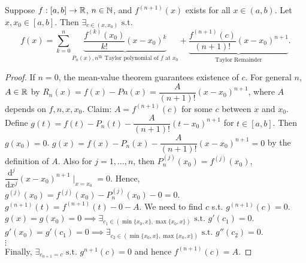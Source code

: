 \begin{thm}
	Suppose $f:[a,b]\to \mathbb{R}$, $n \in \mathbb{N}$, and $f^{(n+1)}(x)$ exists for all $x \in (a,b)$.
	Let $x, x_0 \in [a,b]$. Then $\exists_{c \in (x, x_0)} \text{ s.t. }$
	\[f(x)=\sum_{k=0}^{n}{\underbrace{\dfrac{f^{(k)}(x_0)}{k!} (x-x_0)^{k}}_{P_n(x),\text{$n^{\text{th}}$ Taylor polynomial of $f$ at $x_0$}}+\underbrace{\dfrac{f^{(n+1)}(c)}{(n+1)!}(x-x_0)^{n+1}}_{\text{Taylor Remainder}}}.\]
	\begin{proof}
		If $n=0$, the mean-value theorem guarantees existence of $c$.
		For general $n$, $A \in \mathbb{R}$ by $R_n(x)=f(x)-Pn(x)=\dfrac{A}{(n+1)!}(x-x_0)^{n+1}$, where $A$ depends on $f,n,x,x_0$.
		Claim: $A=f^{(n+1)}(c)$ for some $c$ between $x$ and $x_0$.\\
		Define $g(t)=f(t)-P_{n}(t)-\dfrac{A}{(n+1)!}(t-x_0)^{n+1}$ for $t \in [a,b]$. Then $g(x_0)=0$.
		$g(x)=f(x)-P_{n}(x)-\dfrac{A}{(n+1)!}(x-x_0)^{n+1}=0$ by the definition of $A$.
		Also for $j=1,\ldots ,n$, then $P_{n}^{(j)}(x_0)=f^{(j)}(x_0)$, $\dfrac{\mathrm{d}^{j}}{\mathrm{d}x^{j}}(x-x_0)^{n+1} \mid_{x=x_0}=0$.
		Hence, $g^{(j)}(x_0)=f^{(j)}(x_0)-P_{n}^{(j)}(x_0)-0=0$.
		$g^{(n+1)}(t)=f^{(n+1)}(t)-0-A$.
		We need to find $c$ s.t. $g^{(n+1)}(c)=0$.
		$g(x)=g(x_0)=0 \implies \exists_{c_1 \in (\min\{x_0,x\},\max\{x_0,x\})} \text{ s.t. } g'(c_1)=0$.\\
		$g'(x_0)=g'(c_1)=0 \implies \exists_{c_2 \in (\min\{x_0,x\},\max\{x_0,x\})} \text{ s.t. } g''(c_2)=0$.\\
		$\vdots$\\
		Finally, $\exists_{c_{n+1}=c} \text{ s.t. } g^{n+1}(c)=0$ and hence $f^{(n+1)}(c)=A$.
	\end{proof}
\end{thm}
